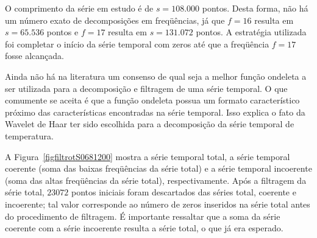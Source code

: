 O comprimento da série em estudo é de $s=108.000$ pontos. Desta forma, não há um número exato de decomposições em freqüências, já que $f=16$ resulta em $s=65.536$ pontos e $f=17$ resulta em $s=131.072$ pontos. A estratégia utilizada foi completar o início da série temporal com zeros até que a freqüência $f=17$ fosse alcançada. 
 
Ainda não há na literatura um consenso de qual seja a melhor função ondeleta a ser utilizada para a decomposição e filtragem de uma série temporal. O que comumente se aceita é que a função ondeleta possua um formato característico próximo das características encontradas na série temporal. Isso explica o fato da Wavelet de Haar ter sido escolhida para a decomposição da série temporal de temperatura.  

A Figura~\ref{figfiltrotS0681200} mostra a série temporal total, a série temporal coerente (soma das baixas freqüências da série total) e a série temporal incoerente (soma das altas freqüências da série total), respectivamente. Após a filtragem da série total, $23072$ pontos iniciais foram descartados das séries total, coerente e incoerente; tal valor corresponde ao número de zeros inseridos na série total antes do procedimento de filtragem. É importante ressaltar que a soma da série coerente com a série incoerente resulta a série total, o que já era esperado.

